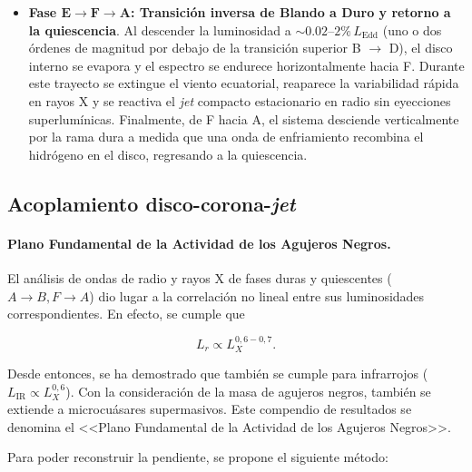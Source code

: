 \begin{itemize}
    \item[$\bullet$] \textbf{Fase $\mathbf{E\to F\to A}$: Transición inversa de Blando a Duro y retorno a la quiescencia}. Al descender la luminosidad a $\sim 0.02\mbox{--}2\%\,L_{\mathrm{Edd}}$ (uno o dos órdenes de magnitud por debajo de la transición superior B $\to$ D), el disco interno se evapora y el espectro se endurece horizontalmente hacia F. Durante este trayecto se extingue el viento ecuatorial, reaparece la variabilidad rápida en rayos X y se reactiva el \textit{jet} compacto estacionario en radio sin eyecciones superlumínicas. Finalmente, de F hacia A, el sistema desciende verticalmente por la rama dura a medida que una onda de enfriamiento recombina el hidrógeno en el disco, regresando a la quiescencia.
\end{itemize}



\subsection{Acoplamiento disco-corona-\textit{jet}}

\paragraph{Plano Fundamental de la Actividad de los Agujeros Negros.} El análisis de ondas de radio y rayos X de fases duras y quiescentes ($A\to B, F\to A$) \cite{fender_gallo} dio lugar a la correlación no lineal entre sus luminosidades correspondientes. En efecto, se cumple que

\begin{equation}
    L_r\propto L_X^{0,6-0,7}.
\end{equation}

\noindent Desde entonces, se ha demostrado que también se cumple para infrarrojos ($L_{\mbox{IR}}\propto L_X^{0,6}$). Con la consideración de la masa de agujeros negros, también se extiende a microcuásares supermasivos. Este compendio de resultados se denomina el <<Plano Fundamental de la Actividad de los Agujeros Negros>>.

Para poder reconstruir la pendiente, se propone el siguiente método:

